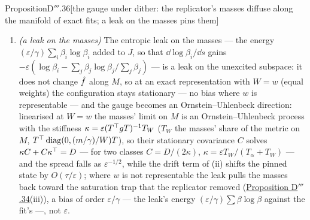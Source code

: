 \begin{thm}{Proposition}{D$'''$.36}[the gauge under dither: the replicator's masses diffuse along the manifold of exact
fits; a leak on the masses pins them]
\begin{enumerate}[label=\textup{(\roman*)}]
    same order in $\tau$ from the second derivative of that map (computed in
    \hyperref[res:thmDppp:37]{Proposition D$'''$.37}). For two classes $D_{11} = 2\tau T_\alpha/(T_\alpha + T_W)^2$,
    $T_\alpha := \sum_k(A_k/(W_k^2a'_k))^2/G_\alpha$, $T_W := (m/\gamma)\sum_k1/W_k$: there is no restoring force in
    $D$; $D\to0$ as $\gamma\to0$ (with equal weights the amplitudes are pinned by the fit) and $D\to2\tau/T_\alpha$
    as $\gamma\to\infty$; at the boundary of the representable set $a'_k\to0$, so the saturating class's row and
    column of $D$ vanish quadratically in $W_k - \abs{A_k}/a_{\max}$ (the other masses keep diffusing), while in the
    amplitude coordinate $\alpha_k\approx-(a_{\max}/2)\log(W_k - \abs{A_k}/a_{\max})$ the diffusion tends to
    $2\tau G_\alpha$ exactly: heuristically the class's excursion into the saturation is unbounded in $\alpha_k$ ---
    outside the theorem, which holds on compact parts of $M$, and subject to the drift of
    \hyperref[res:thmDppp:37]{Proposition D$'''$.37}. The function $\fhat$ does not move: the gauge's motion changes
    the representation's conditioning, not the fit.
  \item \emph{(a leak on the masses)} The entropic leak on the masses --- the energy
    $(\varepsilon/\gamma)\sum_i\beta_i\log\beta_i$ added to $J$, so that $\dd\log\beta_i/\dd s$ gains
    $-\varepsilon(\log\beta_i - \sum_j\beta_j\log\beta_j/\sum_j\beta_j)$ --- is a leak on the unexcited subspace: it
    does not change $\fhat$ along $M$, so at an exact representation with $W = w$ (equal weights) the configuration
    stays stationary --- no bias where $w$ is representable --- and the gauge becomes an Ornstein--Uhlenbeck
    direction: linearised at $W = w$ the masses' limit on $M$ is an Ornstein--Uhlenbeck process with the stiffness
    $\kappa = \varepsilon(T^\top gT)^{-1}T_W$ ($T_W$ the masses' share of the metric on $M$,
    $T^\top\operatorname{diag}(0,(m/\gamma)/W)T$), so their stationary covariance $C$ solves
    $\kappa C + C\kappa^\top = D$ --- for two classes $C = D/(2\kappa)$, $\kappa = \varepsilon T_W/(T_\alpha + T_W)$ ---
    and the spread falls as $\varepsilon^{-1/2}$, while the drift term of (ii) shifts the pinned state by
    $O(\tau/\varepsilon)$; where $w$ is not representable the leak pulls the masses back toward the saturation trap
    that the replicator removed (\hyperref[res:thmDppp:34]{Proposition D$'''$.34}(iii)), a bias of order
    $\varepsilon/\gamma$ --- the leak's energy $(\varepsilon/\gamma)\sum\beta\log\beta$ against the fit's ---, not
    $\varepsilon$.
\end{enumerate}
\end{thm}


